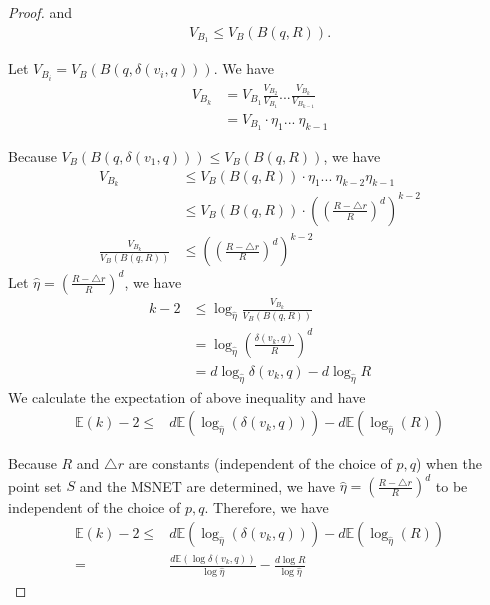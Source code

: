 \documentclass{vldb}
\begin{document}
\begin{appendix}
\begin{proof}
and 
\begin{align*}
V_{B_1} \le V_B(B(q, R)).
\end{align*}

Let $V_{B_i} = V_B(B(q, \delta(v_i,q)))$. We have
\begin{align*}
V_{B_{k}} &= V_{B_1} \frac{V_{B_2}}{V_{B_1}} ... \frac{V_{B_{k}}}{V_{B_{k-1}}} \\
                                            & = V_{B_1} \cdot \eta_1 ... ~ \eta_{k-1}
\end{align*}

Because $V_B(B(q, \delta(v_1,q))) \le V_B(B(q, R))$, we have
\begin{align*}
V_{B_{k}} &\le V_B(B(q, R)) \cdot \eta_1 ...~  \eta_{k-2}\eta_{k-1}\\
                                            &\le V_B(B(q, R)) \cdot ((\frac{R-\triangle{r}}{R})^d)^{k-2}\\
\frac{V_{B_{k}} }{V_B(B(q, R))}& \le ((\frac{R-\triangle{r}}{R})^d)^{k-2}
\end{align*}
Let $\hat{\eta} = (\frac{R-\triangle{r}}{R})^d$, we have
\begin{align*}
                                       k-2&\le  \log_{\hat{\eta}}\frac{V_{B_{k}}}{V_B(B(q, R))}\\
                                            & = \log_{\hat{\eta}}(\frac{\delta(v_k, q)}{R})^d\\
                                            & = d\log_{\hat{\eta}}\delta(v_k, q) - d\log_{\hat{\eta}}R
\end{align*}
We calculate the expectation of above inequality and have
\begin{align*}
\mathbb{E}(k) -2\le & d\mathbb{E}( \log_{\hat{\eta}}(\delta(v_k, q) )) - d\mathbb{E}(\log_{\hat{\eta}}( R) )
\end{align*}

Because $R$ and $ \triangle{r}$ are constants (independent of the choice of $p,q$) when the point set $S$ and the MSNET are determined, we have $\hat{\eta} = (\frac{R-\triangle{r}}{R})^d$ to be independent of the choice of $p,q$. Therefore, we have
\begin{align*}
\mathbb{E}(k) - 2\le & d\mathbb{E}( \log_{\hat{\eta}}(\delta(v_k, q) )) - d\mathbb{E}(\log_{\hat{\eta}}( R) )\\
		           =  & \frac{d\mathbb{E}(\log \delta(v_k, q))}{\log\hat{\eta}} - \frac{d\log R }{\log \hat{\eta}}
\end{align*}


\end{proof}
\end{appendix}
\end{document}
